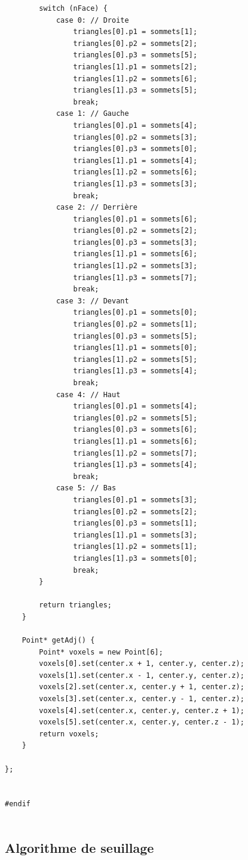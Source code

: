 \documentclass[a4paper,11pt]{article}
\begin{document}
\begin{lstlisting}
		switch (nFace) {
			case 0: // Droite
				triangles[0].p1 = sommets[1];
				triangles[0].p2 = sommets[2];
				triangles[0].p3 = sommets[5];
				triangles[1].p1 = sommets[2];
				triangles[1].p2 = sommets[6];
				triangles[1].p3 = sommets[5];
				break;
			case 1: // Gauche
				triangles[0].p1 = sommets[4];
				triangles[0].p2 = sommets[3];
				triangles[0].p3 = sommets[0];
				triangles[1].p1 = sommets[4];
				triangles[1].p2 = sommets[6];
				triangles[1].p3 = sommets[3];
				break;
			case 2: // Derrière
				triangles[0].p1 = sommets[6];
				triangles[0].p2 = sommets[2];
				triangles[0].p3 = sommets[3];
				triangles[1].p1 = sommets[6];
				triangles[1].p2 = sommets[3];
				triangles[1].p3 = sommets[7];
				break;
			case 3: // Devant
				triangles[0].p1 = sommets[0];
				triangles[0].p2 = sommets[1];
				triangles[0].p3 = sommets[5];
				triangles[1].p1 = sommets[0];
				triangles[1].p2 = sommets[5];
				triangles[1].p3 = sommets[4];
				break;
			case 4: // Haut
				triangles[0].p1 = sommets[4];
				triangles[0].p2 = sommets[5];
				triangles[0].p3 = sommets[6];
				triangles[1].p1 = sommets[6];
				triangles[1].p2 = sommets[7];
				triangles[1].p3 = sommets[4];
				break;
			case 5: // Bas
				triangles[0].p1 = sommets[3];
				triangles[0].p2 = sommets[2];
				triangles[0].p3 = sommets[1];
				triangles[1].p1 = sommets[3];
				triangles[1].p2 = sommets[1];
				triangles[1].p3 = sommets[0];
				break;
		}
		
		return triangles;
	}

	Point* getAdj() {
		Point* voxels = new Point[6];
		voxels[0].set(center.x + 1, center.y, center.z);
		voxels[1].set(center.x - 1, center.y, center.z);
		voxels[2].set(center.x, center.y + 1, center.z);
		voxels[3].set(center.x, center.y - 1, center.z);
		voxels[4].set(center.x, center.y, center.z + 1);
		voxels[5].set(center.x, center.y, center.z - 1);
		return voxels;
	}

};


#endif


\end{lstlisting}

\subsection{Algorithme de seuillage}
\end{document}
